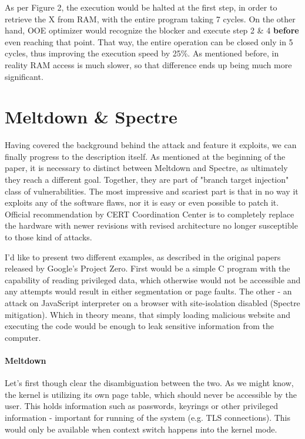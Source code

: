 \documentclass{article}
\begin{document}
As per Figure 2, the execution would be halted at the first step, in order to retrieve the X from RAM, with the entire program taking 7 cycles. On the other hand, OOE optimizer would recognize the blocker and execute step 2 \& 4 \textbf{before} even reaching that point. That way, the entire operation can be closed only in 5 cycles, thus improving the execution speed by 25\%. As mentioned before, in reality RAM access is much slower, so that difference ends up being much more significant.

\section{Meltdown \& Spectre}
 
Having covered the background behind the attack and feature it exploits, we can finally progress to the description itself. As mentioned at the beginning of the paper, it is necessary to distinct between Meltdown and Spectre, as ultimately they reach a different goal. Together, they are part of "branch target injection" class of vulnerabilities. The most impressive and scariest part is that in no way it exploits any of the software flaws, nor it is easy or even possible to patch it. Official recommendation by CERT Coordination Center \cite{Replacement} is to completely replace the hardware with newer revisions with revised architecture no longer susceptible to those kind of attacks.

I'd like to present two different examples, as described in the original papers \cite{kocher2018spectre}\cite{lipp2018meltdown} released by Google's Project Zero. First would be a simple C program with the capability of reading privileged data, which otherwise would not be accessible and any attempts would result in either segmentation or page faults.
The other - an attack on JavaScript interpreter on a browser with site-isolation disabled (Spectre mitigation). Which in theory means, that simply loading malicious website and executing the code would be enough to leak sensitive information from the computer. 


\paragraph{Meltdown}
Let's first though clear the disambiguation between the two. As we might know, the kernel is utilizing its own page table, which should never be accessible by the user. This holds information such as passwords, keyrings or other privileged information - important for running of the system (e.g. TLS connections). This would only be available when context switch happens into the kernel mode.
\end{document}
